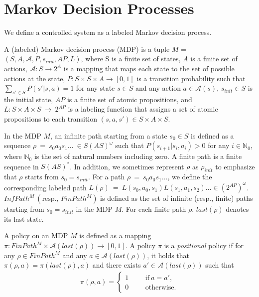 \section{Markov Decision Processes}

We define a controlled system as a labeled Markov decision process.

\begin{definition}
A (labeled) Markov decision process (MDP) is a tuple $M$ = $(S, A, \mathcal{A}, P, s_{init}, AP, L)$, where S is a finite set of states, $A$ is a finite set of actions, $\mathcal{A} : S \rightarrow 2^A$ is a mapping that maps each state to the set of possible actions at the state, $P:S \times S \times A \rightarrow [0,1]$ is a transition probability such that $\sum_{s' \in S} P(s'|s,a) = 1$ for any state $s \in S$ and any action $a \in \mathcal{A}(s) $, $s_{init} \in S$ is the initial state, $AP$ is a finite set of atomic propositions, and $L : S \times A \times S\ \rightarrow\ 2^{AP}$ is a labeling function that assigns a set of atomic propositions to each transition $(s, a, s') \in S \times A \times S$.

In the MDP $M$, an infinite path starting from a state $s_0 \in S$ is defined as a sequence $\rho\ =\ s_0a_0s_1 \ldots\ \in S (A S)^{\omega}$ such that $P(s_{i+1}|s_i, a_i) > 0$ for any $ i \in \mathbb{N}_0$, where $\mathbb{N}_0$ is the set of natural numbers including zero.  A finite path is a finite sequence in $S (A S)^*$. In addition, we sometimes represent $\rho$ as $\rho_{init}$ to emphasize that $\rho$ starts from $s_0 = s_{init}$.
For a path $\rho\ =\ s_0a_0s_1 \ldots$, we define the corresponding labeled path $L(\rho)\ =\ L(s_0,a_0,s_1)L(s_1,a_1,s_2) \ldots \in (2^{AP})^{\omega}$. $InfPath^{M}\ ( \text{resp., }FinPath^{M})$ is defined as the set of infinite (resp., finite) paths starting from $s_0=s_{init}$ in the MDP $M$. For each finite path $\rho$, $last(\rho)$ denotes its last state.
\label{MDP}
\end{definition}

\begin{definition}[Policy]
  A policy on an MDP $M$ is defined as a mapping $\pi:FinPath^{M} \times \mathcal{A}(last(\rho)) \rightarrow [0,1]$. A policy $\pi$ is a {\it positional} policy if for any $ \rho \in FinPath^{M}$ and any $ a \in \mathcal{A}(last(\rho))$, it holds that $\pi(\rho, a)=\pi(last(\rho),a)$ and there exists $ a' \in \mathcal{A}(last(\rho))$ such that
  \begin{align*}
    \pi(\rho, a) =
    \left\{
    \begin{aligned}
      1 &   & &\text{if}\ a=a',\\
      0 &   & &\text{otherwise}.
    \end{aligned}
    \right.
  \end{align*}
\end{definition}


